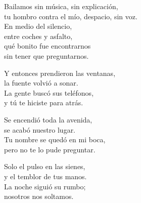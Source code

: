 \begin{lyrics}
Bailamos sin música, sin explicación,\\
tu hombro contra el mío, despacio, sin voz.\\
En medio del silencio,\\
entre coches y asfalto,\\
qué bonito fue encontrarnos\\
sin tener que preguntarnos.

Y entonces prendieron las ventanas,\\
la fuente volvió a sonar.\\
La gente buscó sus teléfonos,\\
y tú te hiciste para atrás.

Se encendió toda la avenida,\\
se acabó nuestro lugar.\\
Tu nombre se quedó en mi boca,\\
pero no te lo pude preguntar.

Solo el pulso en las sienes,\\
y el temblor de tus manos.\\
La noche siguió su rumbo;\\
nosotros nos soltamos.
\end{lyrics}


